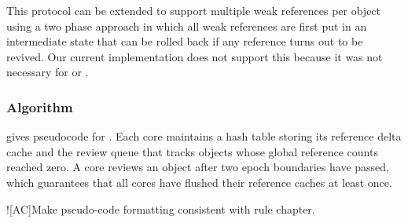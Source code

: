 This protocol can be extended to support multiple weak references per
object using a two phase approach in which all weak references are
first put in an intermediate state that can be rolled back if any
reference turns out to be revived.  Our current implementation does
not support this because it was not necessary for \vm or \fs.

\subsubsection{Algorithm}
 gives pseudocode for .  Each core
maintains a hash table
storing its reference delta cache and the review queue that tracks
objects whose global reference counts reached zero.  A core reviews an
object after two epoch boundaries have passed, which guarantees
that all cores have flushed their
reference caches at least once.

\XXX![AC]{Make pseudo-code formatting consistent with rule chapter.}

